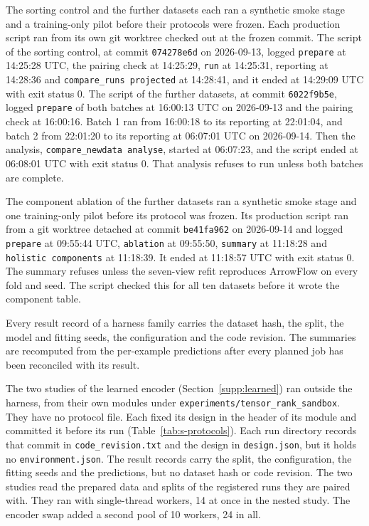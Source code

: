 The sorting control and the further datasets each ran a synthetic smoke stage and a training-only pilot before their protocols were frozen. Each production script ran from its own git worktree checked out at the frozen commit. The script of the sorting control, at commit \texttt{074278e6d} on 2026-09-13, logged \texttt{prepare} at 14:25:28 UTC, the pairing check at 14:25:29, \texttt{run} at 14:25:31, reporting at 14:28:36 and \texttt{compare\_runs projected} at 14:28:41, and it ended at 14:29:09 UTC with exit status 0. The script of the further datasets, at commit \texttt{6022f9b5e}, logged \texttt{prepare} of both batches at 16:00:13 UTC on 2026-09-13 and the pairing check at 16:00:16. Batch 1 ran from 16:00:18 to its reporting at 22:01:04, and batch 2 from 22:01:20 to its reporting at 06:07:01 UTC on 2026-09-14. Then the analysis, \texttt{compare\_newdata analyse}, started at 06:07:23, and the script ended at 06:08:01 UTC with exit status 0. That analysis refuses to run unless both batches are complete.

The component ablation of the further datasets ran a synthetic smoke stage and one training-only pilot before its protocol was frozen. Its production script ran from a git worktree detached at commit \texttt{be41fa962} on 2026-09-14 and logged \texttt{prepare} at 09:55:44 UTC, \texttt{ablation} at 09:55:50, \texttt{summary} at 11:18:28 and \texttt{holistic components} at 11:18:39. It ended at 11:18:57 UTC with exit status 0. The summary refuses unless the seven-view refit reproduces ArrowFlow on every fold and seed. The script checked this for all ten datasets before it wrote the component table.

Every result record of a harness family carries the dataset hash, the split, the model and fitting seeds, the configuration and the code revision. The summaries are recomputed from the per-example predictions after every planned job has been reconciled with its result.

The two studies of the learned encoder (Section~\ref{supp:learned}) ran outside the harness, from their own modules under \texttt{experiments/tensor\_rank\_sandbox}. They have no protocol file. Each fixed its design in the header of its module and committed it before its run (Table~\ref{tab:s-protocols}). Each run directory records that commit in \texttt{code\_revision.txt} and the design in \texttt{design.json}, but it holds no \texttt{environment.json}. The result records carry the split, the configuration, the fitting seeds and the predictions, but no dataset hash or code revision. The two studies read the prepared data and splits of the registered runs they are paired with. They ran with single-thread workers, 14 at once in the nested study. The encoder swap added a second pool of 10 workers, 24 in all.

